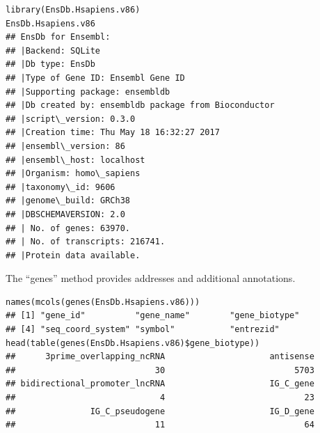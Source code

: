 
\begin{shaded}
\begin{verbatim}
library(EnsDb.Hsapiens.v86)
EnsDb.Hsapiens.v86
## EnsDb for Ensembl:
## |Backend: SQLite
## |Db type: EnsDb
## |Type of Gene ID: Ensembl Gene ID
## |Supporting package: ensembldb
## |Db created by: ensembldb package from Bioconductor
## |script\_version: 0.3.0
## |Creation time: Thu May 18 16:32:27 2017
## |ensembl\_version: 86
## |ensembl\_host: localhost
## |Organism: homo\_sapiens
## |taxonomy\_id: 9606
## |genome\_build: GRCh38
## |DBSCHEMAVERSION: 2.0
## | No. of genes: 63970.
## | No. of transcripts: 216741.
## |Protein data available.
\end{verbatim}
\end{shaded}


The ``genes'' method provides addresses and additional
annotations.

\begin{shaded}
\begin{verbatim}
names(mcols(genes(EnsDb.Hsapiens.v86)))
## [1] "gene_id"          "gene_name"        "gene_biotype"     
## [4] "seq_coord_system" "symbol"           "entrezid"
head(table(genes(EnsDb.Hsapiens.v86)$gene_biotype))
##      3prime_overlapping_ncRNA                     antisense 
##                            30                          5703 
## bidirectional_promoter_lncRNA                     IG_C_gene 
##                             4                            23 
##               IG_C_pseudogene                     IG_D_gene 
##                            11                            64
\end{verbatim}
\end{shaded}

